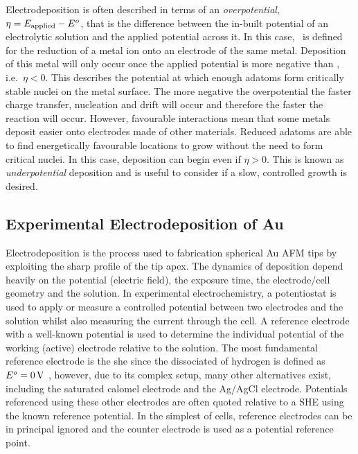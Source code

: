 \documentclass{article}
\begin{document}
Electrodeposition is often described in terms of an \emph{overpotential}, $\eta = E_{\mathrm{applied}} - E^o$, that is the difference between the in-built potential of an electrolytic solution and the applied potential across it.  In this case, \Esp\ is defined for the reduction of a metal ion onto an electrode of the same metal. Deposition of this metal will only occur once the applied potential is more negative than \Esp, i.e.\ $\eta<0$. This describes the potential at which enough adatoms form critically stable nuclei on the metal surface. The more negative the overpotential the faster charge transfer, nucleation and drift will occur and therefore the faster the reaction will occur. However, favourable interactions mean that some metals deposit easier onto electrodes made of other materials. Reduced adatoms are able to find energetically favourable locations to grow without the need to form critical nuclei. In this case, deposition can begin even if $\eta>0$. This is known as \emph{underpotential} deposition and is useful to consider if a slow, controlled growth is desired.

\subsection{Experimental Electrodeposition of Au}


Electrodeposition is the process used to fabrication spherical Au AFM tips by exploiting the sharp profile of the tip apex. The dynamics of deposition depend heavily on the potential (electric field), the exposure time, the electrode/cell geometry and the solution. In experimental electrochemistry, a potentiostat is used to apply or measure a controlled potential between two electrodes and the solution whilst also measuring the current through the cell. A reference electrode with a well-known potential is used to determine the individual potential of the working (active) electrode relative to the solution. The most fundamental reference electrode is the \gls{she} since the dissociated of hydrogen is defined as $E^o=\SI{0}{V}$ \cite{paunovic2006fundamentals}, however, due to its complex setup, many other alternatives exist, including the saturated calomel electrode and the Ag/AgCl electrode. Potentials referenced using these other electrodes are often quoted relative to a SHE using the known reference potential. In the simplest of cells, reference electrodes can be in principal ignored and the counter electrode is used as a potential reference point.
\end{document}
